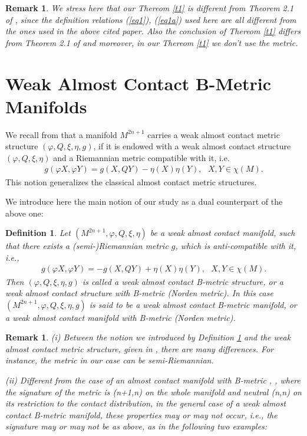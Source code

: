 \documentclass{article}
\newtheorem{definition}[theorem]{Definition}
\newtheorem{remark}[theorem]{Remark}
\begin{document}
\begin{remark}
	We stress here that our Thereom \ref{t1} is different from Theorem 2.1 of \cite{Patra}, since the definition relations (\ref{eq1}), (\ref{eq1a}) used here are all different from the ones used in the above cited paper.	Also the conclusion of Thereom \ref{t1}  differs from Theorem 2.1 of \cite{Patra} and moreover, in our Thereom \ref{t1} we don't use the metric.
\end{remark}

\section{Weak Almost Contact B-Metric Manifolds}

We recall from \cite{Rovenski1} that a manifold $M^{2n+1}$ carries a weak almost contact metric structure $(\varphi,Q,\xi,\eta,g)$, if it is endowed with a weak almost contact structure $(\varphi,Q,\xi,\eta)$ and a Riemannian metric compatible with it, i.e.
\begin{eqnarray*}
	g(\varphi X,\varphi Y)=g(X,QY)-\eta(X)\eta(Y), \ \ \ X,Y\in\chi(M). 
\end{eqnarray*}
This notion generalizes the classical almost contact metric structures. 


\medskip

\noindent We introduce here the main notion of our study as a dual counterpart of the above one: 

\begin{definition} \label{d22}
	Let $(M^{2n+1},\varphi,Q,\xi,\eta)$ be a weak almost contact manifold, such that there exists a (semi-)Riemannian metric $g$, which is anti-compatible with it, i.e., 
	\begin{eqnarray}
		g(\varphi X,\varphi Y)=-g(X,QY)+\eta(X)\eta(Y), \ \ \ X,Y\in\chi(M).  \label{eq4}
	\end{eqnarray}
	Then $(\varphi,Q,\xi,\eta,g)$ is called a weak almost contact B-metric structure, or a\textit{ weak almost contact structure with B-metric (Norden metric)}. In this case $(M^{2n+1},\varphi,Q,\xi,\eta,g)$ is said to be a weak almost contact B-metric manifold, or a \textit{weak almost contact manifold with B-metric (Norden metric)}.
\end{definition}

\begin{remark} (i) Between the notion we introduced by Definition \ref{d22} and the weak almost contact metric structure, given in \cite{Rovenski1}, there are many differences. For instance, the metric in our case can be semi-Riemannian. \medskip
		
\noindent (ii) Different from the case of an almost contact manifold with B-metric \cite{Ganchev1}, \cite{Manev2}, where the signature of the metric is (n+1,n) on the whole manifold and neutral (n,n) on its restriction to the contact distribution, in the general case of a weak almost contact B-metric manifold, these properties may or may not occur, i.e., the signature may or may not be as above, as in the following two examples:
\end{remark}
\end{document}
